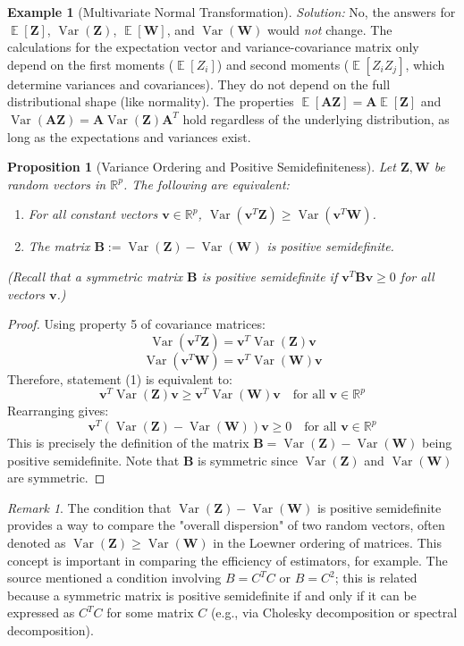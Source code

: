 \documentclass[11pt]{article}
\newtheorem{proposition}[theorem]{Proposition}
\theoremstyle{definition}
\newtheorem{example}[theorem]{Example}
\theoremstyle{remark}
\newtheorem{remark}[theorem]{Remark}
\DeclareMathOperator{\E}{\mathbb{E}}
\DeclareMathOperator{\Var}{\operatorname{Var}}
\begin{document}
\begin{example}[Multivariate Normal Transformation]
    \emph{Solution:}
    No, the answers for $\E[\bm{Z}]$, $\Var(\bm{Z})$, $\E[\bm{W}]$, and $\Var(\bm{W})$ would \emph{not} change. The calculations for the expectation vector and variance-covariance matrix only depend on the first moments ($\E[Z_i]$) and second moments ($\E[Z_i Z_j]$, which determine variances and covariances). They do not depend on the full distributional shape (like normality). The properties $\E[\bm{A}\bm{Z}] = \bm{A}\E[\bm{Z}]$ and $\Var(\bm{A}\bm{Z}) = \bm{A}\Var(\bm{Z})\bm{A}^T$ hold regardless of the underlying distribution, as long as the expectations and variances exist.
\end{example}

\begin{proposition}[Variance Ordering and Positive Semidefiniteness]
Let $\bm{Z}, \bm{W}$ be random vectors in $\mathbb{R}^p$. The following are equivalent:
\begin{enumerate}
    \item For all constant vectors $\bm{v} \in \mathbb{R}^p$, $\Var(\bm{v}^T \bm{Z}) \ge \Var(\bm{v}^T \bm{W})$.
    \item The matrix $\bm{B} := \Var(\bm{Z}) - \Var(\bm{W})$ is positive semidefinite.
\end{enumerate}
(Recall that a symmetric matrix $\bm{B}$ is positive semidefinite if $\bm{v}^T \bm{B} \bm{v} \ge 0$ for all vectors $\bm{v}$.)
\end{proposition}
\begin{proof}
Using property 5 of covariance matrices:
\[ \Var(\bm{v}^T \bm{Z}) = \bm{v}^T \Var(\bm{Z}) \bm{v} \]
\[ \Var(\bm{v}^T \bm{W}) = \bm{v}^T \Var(\bm{W}) \bm{v} \]
Therefore, statement (1) is equivalent to:
\[ \bm{v}^T \Var(\bm{Z}) \bm{v} \ge \bm{v}^T \Var(\bm{W}) \bm{v} \quad \text{for all } \bm{v} \in \mathbb{R}^p \]
Rearranging gives:
\[ \bm{v}^T (\Var(\bm{Z}) - \Var(\bm{W})) \bm{v} \ge 0 \quad \text{for all } \bm{v} \in \mathbb{R}^p \]
This is precisely the definition of the matrix $\bm{B} = \Var(\bm{Z}) - \Var(\bm{W})$ being positive semidefinite. Note that $\bm{B}$ is symmetric since $\Var(\bm{Z})$ and $\Var(\bm{W})$ are symmetric.
\end{proof}
\begin{remark}
The condition that $\Var(\bm{Z}) - \Var(\bm{W})$ is positive semidefinite provides a way to compare the "overall dispersion" of two random vectors, often denoted as $\Var(\bm{Z}) \ge \Var(\bm{W})$ in the Loewner ordering of matrices. This concept is important in comparing the efficiency of estimators, for example. The source mentioned a condition involving $B=C^TC$ or $B=C^2$; this is related because a symmetric matrix is positive semidefinite if and only if it can be expressed as $C^TC$ for some matrix $C$ (e.g., via Cholesky decomposition or spectral decomposition).
\end{remark}
\end{document}
